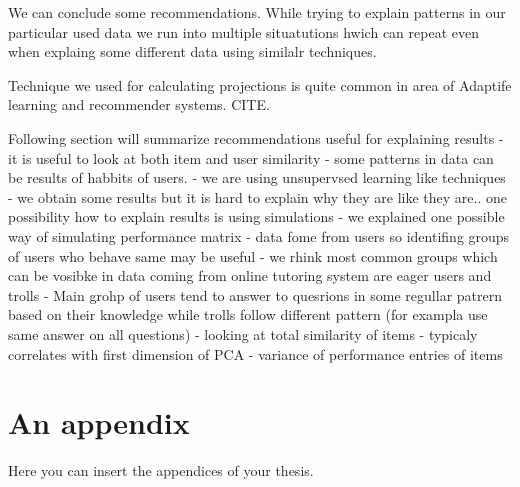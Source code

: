 \documentclass[
  digital, %
  table,   %
  nolof,     %
  nolot,     %
  nocover
]{fithesis3}
\begin{document}
We can conclude some recommendations. While trying to explain patterns
in our particular used data we run into multiple situatutions hwich can
repeat even when explaing some different data using similalr techniques.

Technique we used for calculating projections is quite common in area of
Adaptife learning and recommender systems. CITE.

Following section will summarize recommendations useful for explaining
results - it is useful to look at both item and user similarity - some
patterns in data can be results of habbits of users. - we are using
unsupervsed learning like techniques - we obtain some results but it is
hard to explain why they are like they are.. one possibility how to
explain results is using simulations - we explained one possible way of
simulating performance matrix - data fome from users so identifing
groups of users who behave same may be useful - we rhink most common
groups which can be vosibke in data coming from online tutoring system
are eager users and trolls - Main grohp of users tend to answer to
quesrions in some regullar patrern based on their knowledge while trolls
follow different pattern (for exampla use same answer on all questions)
- looking at total similarity of items - typicaly correlates with first
dimension of PCA - variance of performance entries of items


  \makeatletter\thesis@blocks@clear\makeatother
  \printindex

\appendix %
\chapter{An appendix}
Here you can insert the appendices of your thesis.
\end{document}
